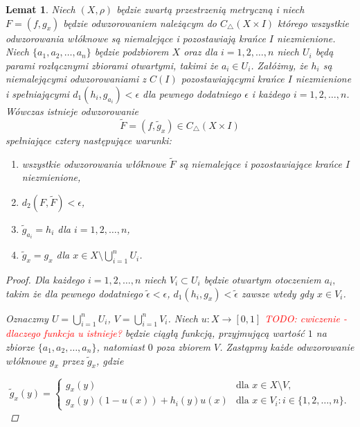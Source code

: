 \documentclass[licencjacka]{pwr_wmat_praca_dyplomowa}
\theoremstyle{plain}
\numberwithin{theorem}{chapter}
\newtheorem{lemma}[theorem]{Lemat}
\theoremstyle{definition}
\numberwithin{theorem}{chapter}
\begin{document}
\begin{lemma}
\label{lemat_4_glownego_artykulu}
\cite{alseda1999entropy}
Niech $(X, \rho)$ będzie zwartą przestrzenią metryczną i niech $F = (f, g_x)$ będzie odwzorowaniem należącym do $C_\triangle(X \times I)$ którego wszystkie odwzorowania włóknowe są niemalejące i pozostawiają krańce $I$ niezmienione. Niech $\{a_1, a_2, \ldots, a_n\}$ będzie podzbiorem $X$ oraz dla $i = 1, 2, \ldots, n$ niech $U_i$ będą parami rozłącznymi zbiorami otwartymi, takimi że $a_i \in U_i$. Załóżmy, że $h_i$ są niemalejącymi odwzorowaniami z $C(I)$ pozostawiającymi krańce $I$ niezmienione i spełniającymi $d_1(h_i, g_{a_i}) < \epsilon$ dla pewnego dodatniego $\epsilon$ i każdego $i = 1, 2, \ldots, n$. Wówczas istnieje odwzorowanie 
$$\widetilde{F} = (f, \widetilde{g}_x) \in C_\triangle(X \times I)$$ spełniające cztery następujące warunki:

\begin{enumerate}
\item  wszystkie odwzorowania włóknowe $\widetilde{F}$ są niemalejące i pozostawiające krańce $I$ niezmienione,
\item $d_2(F, \widetilde{F}) < \epsilon$,
\item $\widetilde{g}_{a_i} = h_i$ dla $i = 1,2,\ldots,n$,
\item $\widetilde{g}_x = g_x$ dla $x \in X \setminus \bigcup_{i=1}^n U_i$.
\end{enumerate}

\begin{proof}
\cite{alseda1999entropy}
Dla każdego $i = 1, 2, \ldots, n$ niech $V_i \subset U_i$ będzie otwartym otoczeniem $a_i,$ takim że dla pewnego dodatniego $\widetilde{\epsilon} < \epsilon$, $d_1(h_i, g_x) < \widetilde{\epsilon}$ zawsze wtedy gdy $x \in V_i$.

Oznaczmy $U = \bigcup_{i=1}^n U_i$, $V = \bigcup_{i=1}^n V_i$. Niech $u : X \longrightarrow [0,1]$ \textcolor{red}{TODO: cwiczenie - dlaczego funkcja u istnieje?} będzie ciągłą funkcją, przyjmującą wartość $1$ na zbiorze $\{a_1, a_2, \ldots, a_n\}$, natomiast $0$ poza zbiorem $V$. Zastąpmy każde odwzorowanie włóknowe $g_x$ przez $\widetilde{g}_x$, gdzie

\begin{equation} \label{lemat4_rownanie_1}
    \widetilde{g}_x(y) =
    \begin{cases}
        g_x(y) & \text{dla $x \in X \setminus V$,}\\
        g_x(y)(1-u(x))+h_i(y)u(x) & \text{dla $x \in V_i : i \in \{1,2,\ldots,n\}$.}
    \end{cases}
\end{equation}


\end{proof}
\end{lemma}
\end{document}
